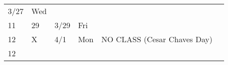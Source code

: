 \begin{longtable}[]{@{}llllll@{}}
\begin{minipage}[t]{0.06\columnwidth}
3/27\strut
\end{minipage} & \begin{minipage}[t]{0.04\columnwidth}\raggedright
Wed\strut
\end{minipage} & \begin{minipage}[t]{0.49\columnwidth}\raggedright
\strut
\end{minipage} & \begin{minipage}[t]{0.17\columnwidth}\raggedright
\strut
\end{minipage}\tabularnewline
\begin{minipage}[t]{0.03\columnwidth}\raggedright
11\strut
\end{minipage} & \begin{minipage}[t]{0.03\columnwidth}\raggedright
29\strut
\end{minipage} & \begin{minipage}[t]{0.06\columnwidth}\raggedright
3/29\strut
\end{minipage} & \begin{minipage}[t]{0.04\columnwidth}\raggedright
Fri\strut
\end{minipage} & \begin{minipage}[t]{0.49\columnwidth}\raggedright
\strut
\end{minipage} & \begin{minipage}[t]{0.17\columnwidth}\raggedright
\strut
\end{minipage}\tabularnewline
\begin{minipage}[t]{0.03\columnwidth}\raggedright
12\strut
\end{minipage} & \begin{minipage}[t]{0.03\columnwidth}\raggedright
X\strut
\end{minipage} & \begin{minipage}[t]{0.06\columnwidth}\raggedright
4/1\strut
\end{minipage} & \begin{minipage}[t]{0.04\columnwidth}\raggedright
Mon\strut
\end{minipage} & \begin{minipage}[t]{0.49\columnwidth}\raggedright
NO CLASS (Cesar Chaves Day)\strut
\end{minipage} & \begin{minipage}[t]{0.17\columnwidth}\raggedright
\strut
\end{minipage}\tabularnewline
\begin{minipage}[t]{0.03\columnwidth}\raggedright
12\strut
\end{minipage} & \begin{minipage}[t]{0.03\columnwidth}\raggedright

\end{minipage}
\end{longtable}
